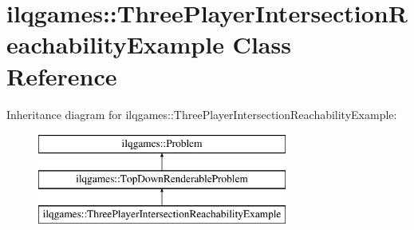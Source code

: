 \hypertarget{classilqgames_1_1_three_player_intersection_reachability_example}{}\section{ilqgames\+:\+:Three\+Player\+Intersection\+Reachability\+Example Class Reference}
\label{classilqgames_1_1_three_player_intersection_reachability_example}
Inheritance diagram for ilqgames\+:\+:Three\+Player\+Intersection\+Reachability\+Example\+:\begin{figure}[H]
\begin{center}
\leavevmode
\includegraphics[height=3.000000cm]{classilqgames_1_1_three_player_intersection_reachability_example}
\end{center}
\end{figure}
